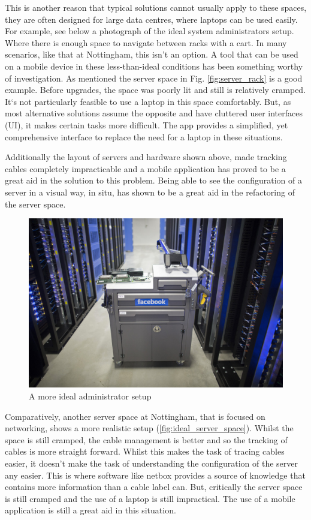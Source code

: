 \documentclass [11pt,a4paper]{article}
\begin{document}
This is another reason that typical solutions cannot usually apply to these spaces, they are often designed for large data centres, where laptops can be used easily. For example, see below a photograph of the ideal system administrators setup. Where there is enough space to navigate between racks with a cart. In many scenarios, like that at Nottingham, this isn't an option. A tool that can be used on a mobile device in these less-than-ideal conditions has been something worthy of investigation. As mentioned the server space in Fig. \ref{fig:server_rack} is a good example. Before upgrades, the space was poorly lit and still is relatively cramped. It`s not particularly feasible to use a laptop in this space comfortably. But, as most alternative solutions assume the opposite and have cluttered user interfaces (UI), it makes certain tasks more difficult. The app provides a simplified, yet comprehensive interface to replace the need for a laptop in these situations.

Additionally the layout of servers and hardware shown above, made tracking cables completely impracticable and a mobile application has proved to be a great aid in the solution to this problem. Being able to see the configuration of a server in a visual way, in situ, has shown to be a great aid in the refactoring of the server space.

\begin{figure}[H]
    \centering
    \includegraphics[width=0.42\linewidth]{images/facebook_cart.jpg}
    \caption{A more ideal administrator setup \cite{rosenblatt_2018}}
    \label{fig:_ideal_server_setup}
\end{figure}

Comparatively, another server space at Nottingham, that is focused on networking, shows a more realistic setup (\ref{fig:ideal_server_space}). Whilst the space is still cramped, the cable management is better and so the tracking of cables is more straight forward. Whilst this makes the task of tracing cables easier, it doesn't make the task of understanding the configuration of the server any easier. This is where software like netbox provides a source of knowledge that contains more information than a cable label can. But, critically the server space is still cramped and the use of a laptop is still impractical. The use of a mobile application is still a great aid in this situation.
\end{document}
